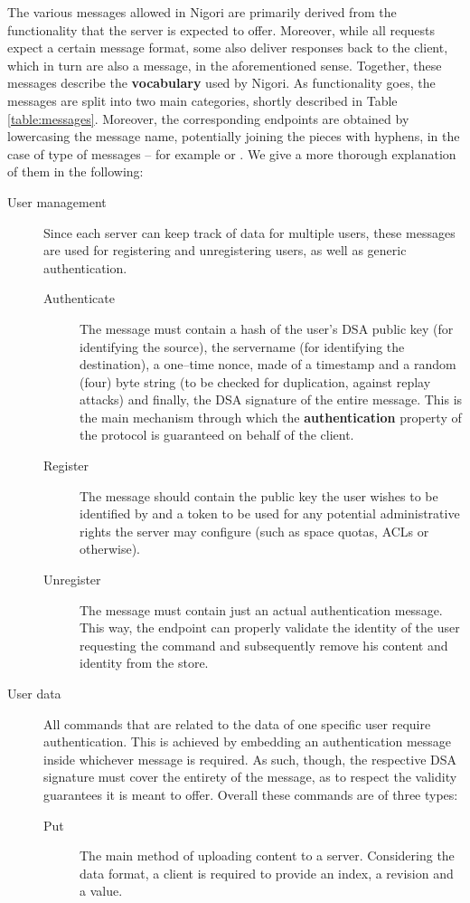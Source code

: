 The various messages allowed in Nigori are primarily derived from the functionality that the server is expected to offer.
Moreover, while all requests expect a certain message format, some also deliver responses back to the client, which in turn are also a message, in the aforementioned sense.
Together, these messages describe the \textbf{vocabulary} used by Nigori.
As functionality goes, the messages are split into two main categories, shortly described in Table \ref{table:messages}.
Moreover, the corresponding endpoints are obtained by lowercasing the message name, potentially joining the pieces with hyphens, in the case of  type of messages -- for example  or .
We give a more thorough explanation of them in the following:
\begin{description}
  \item[User management] Since each server can keep track of data for multiple users, these messages are used for registering and unregistering users, as well as generic authentication.
  \begin{description}
    \item[Authenticate] The message must contain a hash of the user's DSA public key (for identifying the source), the servername (for identifying the destination), a one--time nonce, made of a timestamp and a random (four) byte string (to be checked for duplication, against replay attacks) and finally, the DSA signature of the entire message.
    This is the main mechanism through which the \textbf{authentication} property of the protocol is guaranteed on behalf of the client.

    \item[Register] The message should contain the public key the user wishes to be identified by and a token to be used for any potential administrative rights the server may configure (such as space quotas, ACLs or otherwise).

    \item[Unregister] The message must contain just an actual authentication message.
    This way, the endpoint can properly validate the identity of the user requesting the command and subsequently remove his content and identity from the store.
  \end{description}

  \item[User data] All commands that are related to the data of one specific user require authentication.
  This is achieved by embedding an authentication message inside whichever message is required.
  As such, though, the respective DSA signature must cover the entirety of the message, as to respect the validity guarantees it is meant to offer.
  Overall these commands are of three types:
  \begin{description}
    \item[Put] The main method of uploading content to a server.
    Considering the data format, a client is required to provide an index, a revision and a value.


\end{description}
\end{description}

